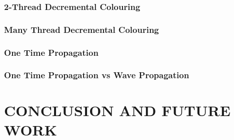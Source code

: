 \documentclass[MTech]{iitmdiss}
\begin{document}
\subsection{2-Thread Decremental Colouring}
\subsection{Many Thread Decremental Colouring}
\subsection{One Time Propagation}
\subsection{One Time Propagation vs Wave Propagation}

\chapter{CONCLUSION AND FUTURE WORK}





%
%

\pagebreak
\begin{singlespace}
  \begin{small}
	
  \end{small}
\end{singlespace}



%
\end{document}
